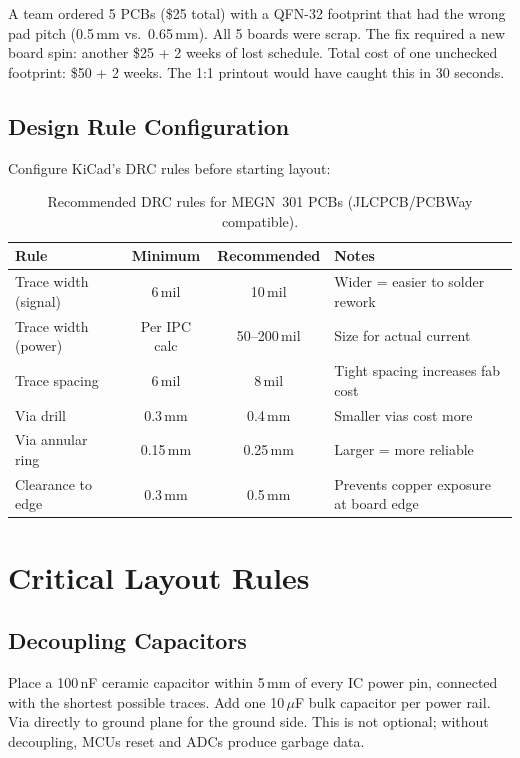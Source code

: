 \documentclass[11pt,letterpaper,twoside,openany]{book}
\begin{document}
\begin{warningbox}
A team ordered 5 PCBs (\$25 total) with a QFN-32 footprint that had the wrong pad pitch (0.5\,mm vs.\ 0.65\,mm). All 5 boards were scrap. The fix required a new board spin: another \$25 + 2 weeks of lost schedule. Total cost of one unchecked footprint: \$50 + 2 weeks. The 1:1 printout would have caught this in 30 seconds.
\end{warningbox}

\subsection{Design Rule Configuration}
Configure KiCad's DRC rules before starting layout:
\begin{table}[htbp]\centering\small
\begin{tabularx}{\textwidth}{l c c X}
\toprule
\textbf{Rule} & \textbf{Minimum} & \textbf{Recommended} & \textbf{Notes} \\
\midrule
Trace width (signal) & 6\,mil & 10\,mil & Wider = easier to solder rework \\
Trace width (power) & Per IPC calc & 50--200\,mil & Size for actual current \\
Trace spacing & 6\,mil & 8\,mil & Tight spacing increases fab cost \\
Via drill & 0.3\,mm & 0.4\,mm & Smaller vias cost more \\
Via annular ring & 0.15\,mm & 0.25\,mm & Larger = more reliable \\
Clearance to edge & 0.3\,mm & 0.5\,mm & Prevents copper exposure at board edge \\
\bottomrule
\end{tabularx}
\caption{Recommended DRC rules for MEGN~301 PCBs (JLCPCB/PCBWay compatible).}
\end{table}

\section{Critical Layout Rules}

\subsection{Decoupling Capacitors}
Place a 100\,nF ceramic capacitor within 5\,mm of every IC power pin, connected with the shortest possible traces. Add one 10\,$\mu$F bulk capacitor per power rail. Via directly to ground plane for the ground side. This is not optional; without decoupling, MCUs reset and ADCs produce garbage data.
\end{document}
